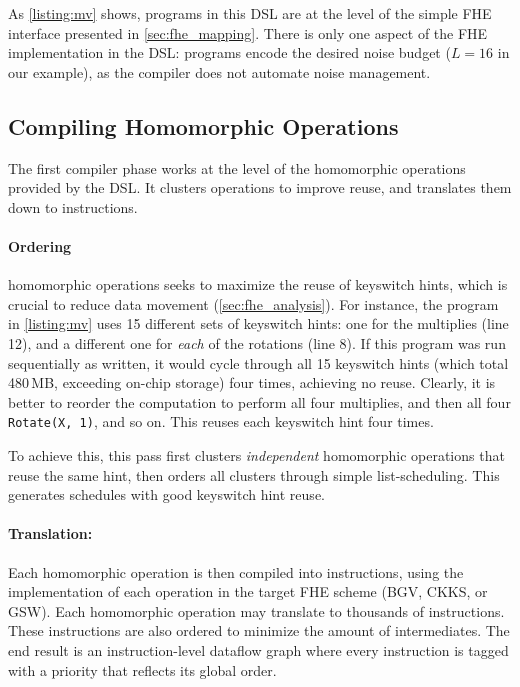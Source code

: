As \autoref{listing:mv} shows, programs in this DSL are at the level of the
simple FHE interface presented in \autoref{sec:fhe_mapping}. There is only one
aspect of the FHE implementation in the DSL: programs encode the desired noise
budget ($L=16$ in our example), as the compiler does not automate noise
management.

\subsection{Compiling Homomorphic Operations}

The first compiler phase works at the level of the homomorphic operations
provided by the DSL. It clusters operations to improve reuse, and translates
them down to instructions.

\paragraph{Ordering} homomorphic operations seeks to maximize the reuse of
keyswitch hints, which is crucial to reduce data movement
(\autoref{sec:fhe_analysis}). For instance, the program in \autoref{listing:mv}
uses 15 different sets of keyswitch hints: one for the multiplies (line
12), and a different one for \emph{each} of the rotations (line 8). If this
program was run sequentially as written, it would cycle through all 15
keyswitch hints (which total 480\,MB, exceeding on-chip storage) four times,
achieving no reuse. Clearly, it is better to reorder the computation to perform
all four multiplies, and then all four \texttt{Rotate(X, 1)}, and so on. This
reuses each keyswitch hint four times.

To achieve this, this pass first clusters \emph{independent} homomorphic
operations that reuse the same hint, then orders all clusters through simple
list-scheduling. This generates schedules with good keyswitch hint reuse.

\paragraph{Translation:} Each homomorphic operation is then compiled into
instructions, using the implementation of each operation in the target FHE
scheme (BGV, CKKS, or GSW). Each homomorphic operation may translate to
thousands of instructions. These instructions are also ordered to minimize the
amount of intermediates. The end result is an instruction-level dataflow graph
where every instruction is tagged with a priority that reflects its global
order.

